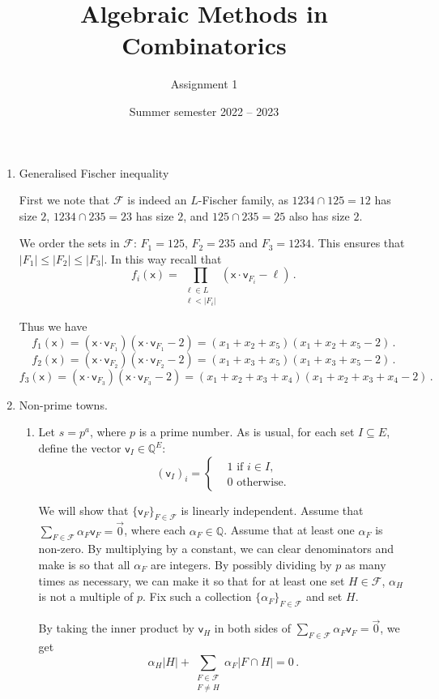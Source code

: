 \documentclass[kulak]{tplt}
\title{Algebraic Methods in Combinatorics}
\author{Assignment 1}
\date{Summer semester 2022 -- 2023}
\theoremstyle{definition}
\newcommand{\Q}{\mathbb{Q}}
\newcommand{\FF}{\mathcal F}
\newcommand{\vv}{\mathsf{v}}
\newcommand{\vx}{\mathsf{x}}
\begin{document}
\maketitle
\begin{enumerate}
\item Generalised Fischer inequality

First we note that $\FF $ is indeed an $L$-Fischer family, as $1234 \cap 125 = 12 $ has size $2$, $1234 \cap 235 = 23 $ has size $2$, and $125 \cap 235 = 25 $ also has size $2$.

We order the sets in $\FF $: $F_1 = 125$, $F_2 = 235$ and $F_3 = 1234$.
This ensures that $|F_1 | \leq |F_2| \leq |F_3|$.
In this way recall that
$$f_i (\vx) = \prod_{\substack{\ell \in L \\ \ell < |F_i|}} (\vx \cdot \vv_{F_i} - \ell ) \, . $$

Thus we have 
$$f_1(\vx) = ( \vx \cdot \vv_{F_1} ) (\vx \cdot \vv_{F_1} - 2 ) = (x_1 + x_2 + x_5 ) (x_1 + x_2 + x_5 - 2) \,  . $$
$$f_2(\vx) = ( \vx \cdot \vv_{F_2} ) (\vx \cdot \vv_{F_2} - 2 ) = (x_1 + x_3 + x_5 ) (x_1 + x_3 + x_5 - 2) \,  . $$
$$f_3(\vx) = ( \vx \cdot \vv_{F_3} ) (\vx \cdot \vv_{F_3} - 2 ) = (x_1 + x_2 + x_3 + x_4 ) (x_1 + x_2 + x_3 + x_4 - 2) \,  . $$


\item Non-prime towns.

\begin{enumerate}
\item 
Let $s = p^a$, where $p$ is a prime number.
As is usual, for each set $I \subseteq E$, define the vector $\vv_I \in \Q^E$:
$$ (\vv_I)_i =\begin{cases*}
      & 1 \text{ if $i \in I$,}\\
      & 0 \text{ otherwise.}
    \end{cases*} $$

We will show that $\{\vv_F\}_{F\in \FF}$ is linearly independent.
Assume that $\sum_{F \in \FF} \alpha_F \vv_F = \vec{0}$, where each $\alpha_F \in \Q$.
Assume that at least one $\alpha_F$ is non-zero.
By multiplying by a constant, we can clear denominators and make is so that all $\alpha_F$ are integers.
By possibly dividing by $p$ as many times as necessary, we can make it so that for at least one set $H\in \FF$, $\alpha_H$ is not a multiple of $p$.
Fix such a collection $\{\alpha_F\}_{F \in \FF}$ and set $H$.

By taking the inner product by $\vv_H$ in both sides of $\sum_{F \in \FF} \alpha_F \vv_F = \vec{0}$, we get
$$\alpha_H |H| + \sum_{\substack{F \in \FF\\ F \neq H}} \alpha_F |F \cap H| =  0  \, .$$


\end{enumerate}
\end{enumerate}
\end{document}
